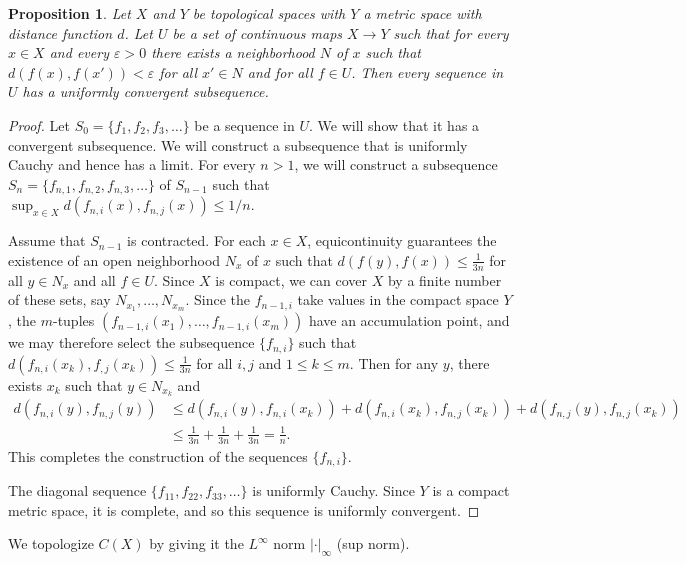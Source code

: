 \documentclass[12pt,reqno]{book}%
\newtheorem{proposition}{Proposition}[chapter]
\theoremstyle{definition}
\theoremstyle{remark}
\theoremstyle{theorem}
\theoremstyle{remark}
\begin{document}
\begin{proposition}\label{prop3.1}%
    Let $X$ and $Y$ be topological spaces with $Y$ a metric space with distance function $d$.
    Let $U$ be a set of continuous maps $X \to Y$ such that for every $x \in X$ and every $\varepsilon > 0$ there exists a neighborhood $N$ of $x$ such that $d(f(x), f(x')) < \varepsilon$ for all $x' \in N$ and for all $f \in U$.
    Then every sequence in $U$ has a uniformly convergent subsequence.
\end{proposition}%
\begin{proof}%
    Let $S_0 = \{f_1, f_2, f_3, \ldots\}$ be a sequence in $U$.
    We will show that it has a convergent subsequence.
    We will construct a subsequence that is uniformly Cauchy and hence has a limit.
    For every $n > 1$, we will construct a subsequence $S_n = \{f_{n,1}, f_{n,2}, f_{n,3}, \ldots \}$ of $S_{n-1}$ such that $\sup_{x \in X} d(f_{n,i}(x), f_{n,j}(x)) \leq 1/n$.

    Assume that $S_{n-1}$ is contracted.
    For each $x \in X$, equicontinuity guarantees the existence of an open neighborhood $N_x$ of $x$ such that $d(f(y), f(x)) \leq \frac{1}{3n}$ for all $y \in N_x$ and all $f \in U$.
    Since $X$ is compact, we can cover $X$ by a finite number of these sets, say $N_{x_1}, \ldots, N_{x_m}$.
    Since the $f_{n-1, i}$ take values in the compact space $Y$, the $m$-tuples $(f_{n-1, i}(x_1), \ldots, f_{n-1, i}(x_m))$ have an accumulation point, and we may therefore select the subsequence $\{f_{n, i}\}$ such that $d(f_{n, i}(x_k), f_{, j}(x_k)) \leq \frac{1}{3n}$ for all $i, j$ and $1 \leq k \leq m$.
    Then for any $y$, there exists $x_k$ such that $y \in N_{x_k}$ and
    \begin{align*}
        d(f_{n, i}(y), f_{n, j}(y)) &\leq d(f_{n, i}(y), f_{n, i}(x_k)) + d(f_{n, i}(x_k), f_{n, j}(x_k)) + d(f_{n, j}(y), f_{n, j}(x_k)) \\
        &\leq \frac{1}{3n} + \frac{1}{3n} + \frac{1}{3n} = \frac{1}{n}.
    \end{align*}
    This completes the construction of the sequences $\{f_{n, i}\}$.

    The diagonal sequence $\{f_{11}, f_{22}, f_{33}, \ldots \}$ is uniformly Cauchy.
    Since $Y$ is a compact metric space, it is complete, and so this sequence is uniformly convergent.
\end{proof}%

We topologize $C(X)$ by giving it the $L^\infty$ norm $| \cdot |_\infty$ (sup norm).
\end{document}
